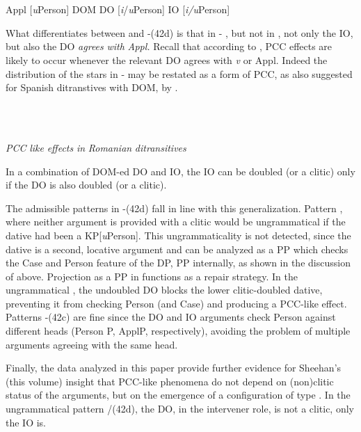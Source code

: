 \documentclass[output=paper,modfonts,nonflat]{langsci/langscibook}
\begin{document}
\ea%
    \label{ex:key:43}
    \gll\\
        \\
    \glt
    \z

          Appl [\textit{u}Person]  DOM DO [\textit{i}/\textit{u}Person]  IO [\textit{i/u}Person]

What differentiates between  and -(42d) is that in - , but not in , not only the IO, but also the DO \textit{agrees} \textit{with} \textit{Appl.} Recall that according to \citet{Preminger2017}, PCC effects are likely to occur whenever the relevant DO agrees with \textit{v} or Appl. Indeed the distribution of the stars in -  may be restated as a form of PCC, as also suggested for Spanish ditranstives with DOM, by \citet{OrmazabalRomero2013}.

\ea%
    \label{ex:key:44}
    \gll\\
        \\
    \glt
    \z

          \textit{PCC} \textit{like} \textit{effects} \textit{in} \textit{Romanian} \textit{ditransitives}

In a combination of DOM-ed DO and IO, the IO can be doubled (or a clitic) only if the DO is also doubled (or a clitic). 

The admissible patterns in -(42d) fall in line with this generalization. Pattern , where neither argument is provided with a clitic would be ungrammatical if the dative had been a KP[\textit{u}Person]. This ungrammaticality is not detected, since the dative is a second, locative argument and can be analyzed as a PP which checks the Case and Person feature of the DP, PP internally, as shown in the discussion of  above. Projection as a PP in  functions as a repair strategy. In the ungrammatical , the undoubled DO blocks the lower clitic-doubled dative, preventing it from checking Person (and Case) and producing a PCC-like effect. Patterns -(42c) are fine since the DO and IO arguments check Person against different heads (Person P, ApplP, respectively), avoiding the problem of multiple arguments agreeing with the same head.

Finally, the data analyzed in this paper provide further evidence for Sheehan’s (this volume) insight that PCC-like phenomena do not depend on (non)clitic status of the arguments, but on the emergence of a configuration of type . In the ungrammatical pattern /(42d), the DO, in the intervener role, is not a clitic, only the IO is.
\end{document}
